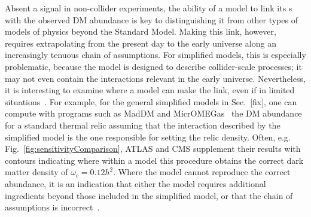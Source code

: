 
Absent a signal in non-collider experiments, the ability of a model to link its {\IP}s with the observed DM abundance is key to distinguishing it from other types of models of physics beyond the Standard Model.
Making this link, however, requires extrapolating from the present day to the early universe along an increasingly tenuous chain of assumptions.
For simplified models, this is especially problematic, because the model is designed to describe collider-scale processes; it may not even contain the interactions relevant in the early universe.
Nevertheless, it is interesting to examine where a model can make the link, even if in limited situations~\cite{Busoni:2014gta,Catena:2017xqq}.
For example, for the general simplified models in Sec.~[fix], one can compute with programs such as MadDM and MicrOMEGas~\cite{Backovic:2015cra,Barducci:2016pcb} the DM abundance for a standard thermal relic assuming that the interaction described by the simplified model is the one responsible for setting the relic density.
Often, e.g. Fig.~\ref{fig:sensitivityComparison}, ATLAS and CMS supplement their results with contours indicating where within a model this procedure obtains the correct dark matter density of $\omega_c = 0.12 h^2$.
Where the model cannot reproduce the correct abundance, it is an indication that either the model requires additional ingredients beyond those included in the simplified model, or that the chain of assumptions is incorrect~\cite{Bernal:2017kxu}.







